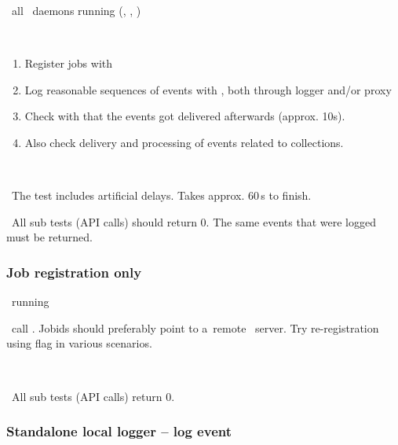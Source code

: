 \req\ all \LB\ daemons running (, ,
)

\what\ 
\begin{enumerate}
\item Register jobs with  
\item Log reasonable sequences of events with , both through logger and/or proxy
\item Check with \code{edg\_wll\_JobLog} that the events got delivered afterwards (approx. 10s).
\item Also check delivery and processing of events related to collections.
\end{enumerate}

\how\ 
%

\note\ The test includes artificial delays. Takes approx. 60\,s to finish.

\result\ All sub tests (API calls) should return 0. The same events that were logged must be returned.


\subsubsection{Job registration only}
\label{reg}
\req\ running 

\what\ call . Jobids should preferably point
to a~remote \LB\ server. Try re-registration using flag  in various scenarios.

\how\ 

\result\ All sub tests (API calls) return 0.




\subsubsection{Standalone local logger -- log event}
\label{log}

